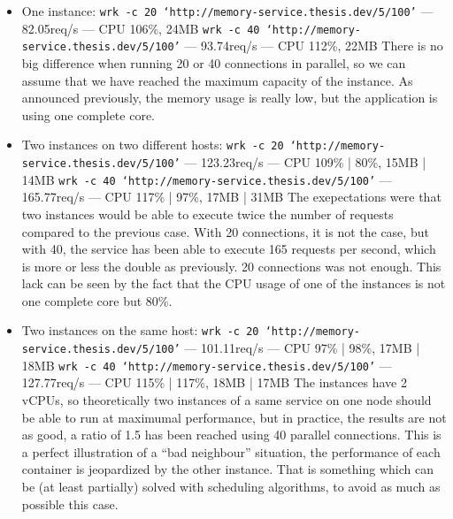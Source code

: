 \begin{itemize}
	\item{One instance: \newline
	\texttt{wrk -c 20 `http://memory-service.thesis.dev/5/100'} --- 82.05req/s --- CPU 106\%, 24MB \newline
	\texttt{wrk -c 40 `http://memory-service.thesis.dev/5/100'} --- 93.74req/s --- CPU 112\%, 22MB \newline
	There is no big difference when running 20 or 40 connections in parallel, so we can assume that we have
	reached the maximum capacity of the instance. As announced previously, the memory usage is really low, but
	the application is using one complete core.\vspace{1em}}
	\item{Two instances on two different hosts: \newline
	\texttt{wrk -c 20 `http://memory-service.thesis.dev/5/100'} --- 123.23req/s --- CPU 109\% | 80\%, 15MB | 14MB \newline
	\texttt{wrk -c 40 `http://memory-service.thesis.dev/5/100'} --- 165.77req/s --- CPU 117\% | 97\%, 17MB | 31MB \newline
	The exepectations were that two instances would be able to execute twice the number of requests compared to
	the previous case. With 20 connections, it is not the case, but with 40, the service has been able to execute
	165 requests per second, which is more or less the double as previously. 20 connections was not enough. This
	lack can be seen by the fact that the CPU usage of one of the instances is not one complete core but 80\%.}
	\item{Two instances on the same host: \newline
	\texttt{wrk -c 20 `http://memory-service.thesis.dev/5/100'} --- 101.11req/s --- CPU 97\% | 98\%, 17MB | 18MB \newline
	\texttt{wrk -c 40 `http://memory-service.thesis.dev/5/100'} --- 127.77req/s --- CPU 115\% | 117\%, 18MB | 17MB \newline
	The instances have 2 vCPUs, so theoretically two instances of a same service on one node should be able to run
	at maximumal performance, but in practice, the results are not as good, a ratio of 1.5 has been reached using
	40 parallel connections. This is a perfect illustration of a ``bad neighbour'' situation, the performance of
	each container is jeopardized by the other instance. That is something which can be (at least partially) solved
	with scheduling algorithms, to avoid as much as possible this case.}
\end{itemize}

